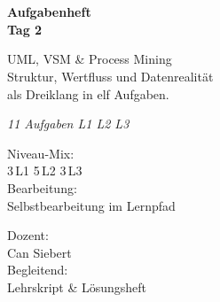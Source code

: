 \documentclass[11pt,a4paper,oneside]{article}
\newcommand{\caveatfontfallback}{\itshape}
\newcommand\caveatfont{\caveatfontfallback}%
\begin{document}
\begin{titlepage}
  \pagestyle{empty}
  \vspace*{1.5cm}
  \\[2pt]
  \noindent{\color{lpAccent}\rule{\linewidth}{1.2pt}}\\[4pt]

  \vspace{3cm}
  {\sffamily\fontsize{30}{34}\selectfont\bfseries\color{lpInk}Aufgabenheft\\Tag 2\par}

  \vspace{0.7cm}
  {\sffamily\large\color{lpGray}UML, VSM \& Process Mining \textendash{}\\Struktur, Wertfluss und Daten\-realit\"at\\als Dreiklang in elf Aufgaben.\par}

  \vspace{1.5cm}
  {\caveatfont\LARGE\color{lpAmber}11 Aufgaben \textperiodcentered{} L1 \textperiodcentered{} L2 \textperiodcentered{} L3}\par

  \vfill

  \noindent\begin{minipage}{0.55\linewidth}
    {\sffamily\footnotesize\color{lpGray}Niveau-Mix:}\\
    {\sffamily\small\color{lpInk}3\,\textsf{L1} \textperiodcentered{} 5\,\textsf{L2} \textperiodcentered{} 3\,\textsf{L3}}\\[10pt]
    {\sffamily\footnotesize\color{lpGray}Bearbeitung:}\\
    {\sffamily\small\color{lpInk}Selbstbearbeitung im Lernpfad}
  \end{minipage}\hfill
  \begin{minipage}{0.4\linewidth}
    \raggedleft
    {\sffamily\footnotesize\color{lpGray}Dozent:}\\
    {\sffamily\small\color{lpInk}Can Siebert}\\[10pt]
    {\sffamily\footnotesize\color{lpGray}Begleitend:}\\
    {\sffamily\small\color{lpInk}Lehrskript \& L\"osungsheft}
  \end{minipage}

  \vspace{0.5cm}
  \noindent{\color{lpAccent}\rule{\linewidth}{0.6pt}}
\end{titlepage}
\end{document}
